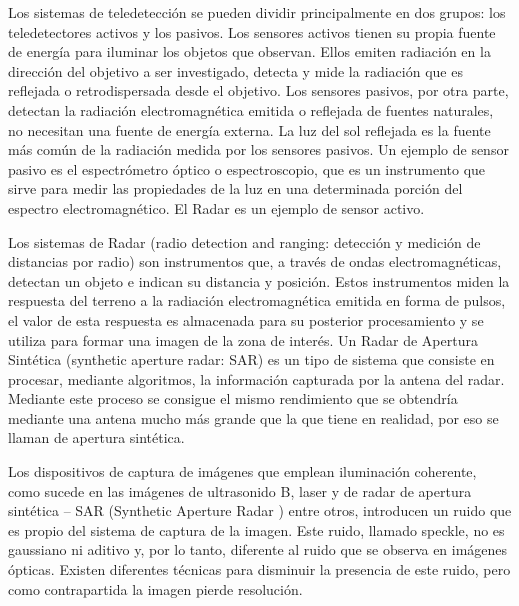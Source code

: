 Los sistemas de teledetección se pueden dividir principalmente en dos grupos: los teledetectores activos y los pasivos. Los sensores activos tienen su propia fuente de energía para iluminar los objetos que observan. Ellos emiten radiación en la dirección del objetivo a ser investigado, detecta y mide la radiación que es reflejada o retrodispersada desde el objetivo. Los sensores pasivos, por otra parte, detectan la radiación electromagnética emitida o reflejada de fuentes naturales, no necesitan una fuente de energía externa. La luz del sol reflejada es la fuente más común de la radiación medida por los sensores pasivos. Un ejemplo de sensor pasivo es el espectrómetro óptico o espectroscopio, que es un instrumento que sirve para medir las propiedades de la luz en una determinada porción del espectro electromagnético. El Radar es un ejemplo de sensor activo.


Los sistemas de Radar (radio detection and ranging: detección y medición de distancias por radio) son instrumentos que, a través de ondas electromagnéticas, detectan un objeto e indican su distancia y posición. Estos instrumentos miden la respuesta del terreno a la radiación electromagnética emitida en forma de pulsos, el valor de esta respuesta es almacenada para su posterior procesamiento y se utiliza para formar una imagen de la zona de interés. Un Radar de Apertura Sintética (synthetic aperture radar: SAR) es un tipo de sistema que consiste en procesar, mediante algoritmos, la información capturada por la antena del radar. Mediante este proceso se consigue el mismo rendimiento que se obtendría mediante una antena mucho más grande que la que tiene en realidad, por eso se llaman de apertura sintética. 

Los dispositivos de captura de imágenes que emplean iluminación coherente, como sucede en las imágenes de ultrasonido B, laser y de radar de apertura sintética – SAR (Synthetic Aperture Radar ) entre otros, introducen un ruido que es propio del sistema de captura de la imagen. Este ruido, llamado speckle, no es gaussiano ni aditivo y, por lo tanto, diferente al ruido que se observa en imágenes ópticas. Existen diferentes técnicas para disminuir la presencia de este ruido, pero como contrapartida la imagen pierde resolución.

